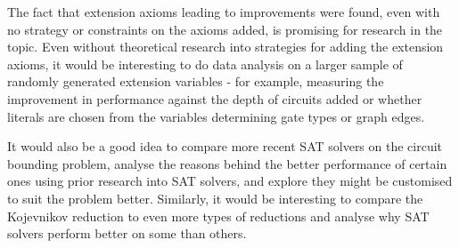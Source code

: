 \documentclass{article}
\begin{document}
The fact that extension axioms leading to improvements were found, even with no strategy or constraints on the axioms added, is promising for research in the topic. Even without theoretical research into strategies for adding the extension axioms, it would be interesting to do data analysis on a larger sample of randomly generated extension variables - for example, measuring the improvement in performance against the depth of circuits added or whether literals are chosen from the variables determining gate types or graph edges.

It would also be a good idea to compare more recent SAT solvers on the circuit bounding problem, analyse the reasons behind the better performance of certain ones using prior research into SAT solvers, and explore they might be customised to suit the problem better. Similarly, it would be interesting to compare the Kojevnikov reduction to even more types of reductions and analyse why SAT solvers perform better on some than others.

 

\end{document}
